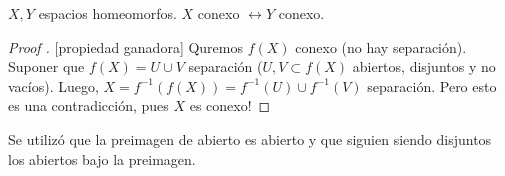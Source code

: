\begin{corollary}
	$X,Y$ espacios homeomorfos. $X$ conexo $\longleftrightarrow Y$ conexo.
\end{corollary}

\begin{proof}[Proof ][propiedad ganadora]
	Quremos $f(X)$ conexo (no hay separación). Suponer que $f(X) = U \cup V$ separación ($U,V \subset f(X)$ abiertos, disjuntos y no vacíos). Luego, $X = f^{-1}(f(X)) = f^{-1}(U) \cup f^{-1}(V)$ separación. Pero esto es una contradicción, pues $X$ es conexo!
\end{proof}

\begin{note}
	Se utilizó que la preimagen de abierto es abierto y que siguien siendo disjuntos los abiertos bajo la preimagen.
\end{note}

